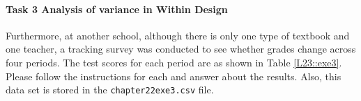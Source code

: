 \documentclass{ltjbook}
\begin{document}


\paragraph{Task 3 Analysis of variance in Within Design}
Furthermore, at another school, although there is only one type of textbook and one teacher, a tracking survey was conducted to see whether grades change across four periods.
The test scores for each period are as shown in Table \ref{L23::exe3}. Please follow the instructions for each and answer about the results. Also, this data set is stored in the \texttt{chapter22exe3.csv} file.




\end{document}
